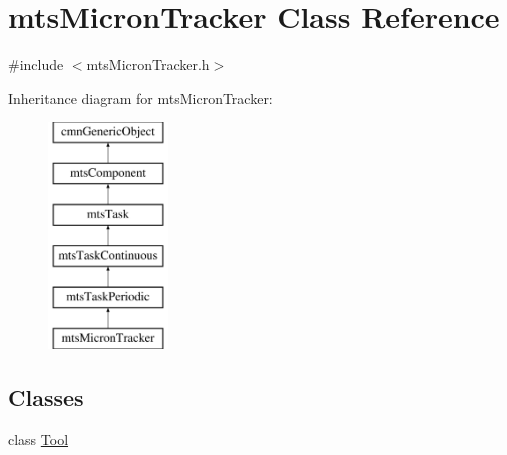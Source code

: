 \hypertarget{classmts_micron_tracker}{}\section{mts\+Micron\+Tracker Class Reference}
\label{classmts_micron_tracker}


{\ttfamily \#include $<$mts\+Micron\+Tracker.\+h$>$}

Inheritance diagram for mts\+Micron\+Tracker\+:\begin{figure}[H]
\begin{center}
\leavevmode
\includegraphics[height=6.000000cm]{d5/d86/classmts_micron_tracker}
\end{center}
\end{figure}
\subsection*{Classes}
\begin{DoxyCompactItemize}
\item 
class \hyperlink{classmts_micron_tracker_1_1_tool}{Tool}
\end{DoxyCompactItemize}
